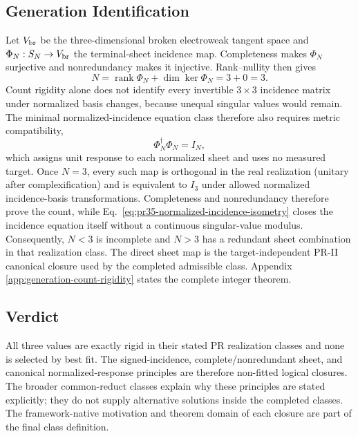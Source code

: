 \subsection{Generation Identification}

Let $V_{\rm br}$ be the three-dimensional broken electroweak tangent space and $\Phi_N:S_N\to V_{\rm br}$ the terminal-sheet incidence map.  Completeness makes $\Phi_N$ surjective and nonredundancy makes it injective.  Rank--nullity then gives
\begin{equation}
 N=\operatorname{rank}\Phi_N+\dim\ker\Phi_N=3+0=3.
\end{equation}
Count rigidity alone does not identify every invertible $3\times3$ incidence matrix under normalized basis changes, because unequal singular values would remain.  The minimal normalized-incidence equation class therefore also requires metric compatibility,
\begin{equation}
 \Phi_N^\dagger\Phi_N=I_N,
 \label{eq:pr35-normalized-incidence-isometry}
\end{equation}
which assigns unit response to each normalized sheet and uses no measured target.  Once $N=3$, every such map is orthogonal in the real realization (unitary after complexification) and is equivalent to $I_3$ under allowed normalized incidence-basis transformations.  Completeness and nonredundancy therefore prove the count, while Eq.~\eqref{eq:pr35-normalized-incidence-isometry} closes the incidence equation itself without a continuous singular-value modulus. Consequently, $N<3$ is incomplete and $N>3$ has a redundant sheet combination in that realization class.  The direct sheet map is the target-independent PR-II canonical closure used by the completed admissible class.  Appendix \ref{app:generation-count-rigidity} states the complete integer theorem.

\subsection{Verdict}

All three values are exactly rigid in their stated PR realization classes and none is selected by best fit.  The signed-incidence, complete/nonredundant sheet, and canonical normalized-response principles are therefore non-fitted logical closures.  The broader common-reduct classes explain why these principles are stated explicitly; they do not supply alternative solutions inside the completed classes.  The framework-native motivation and theorem domain of each closure are part of the final class definition.

